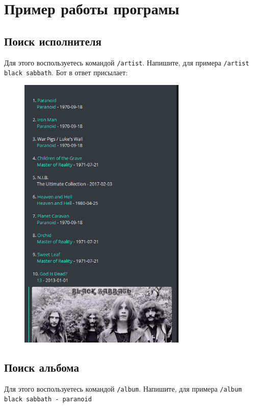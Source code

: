 \chapter{Пример работы програмы}

\section{Поиск исполнителя}

Для этого воспользуетесь командой \texttt{/artist}.  Напишите, для
примера \texttt{/artist black sabbath}.  Бот в ответ присылает:

\begin{figure}[H]
  \centering
  \includegraphics[width=8cm]{inc/img/artist.png}
\end{figure}

\section{Поиск альбома}

Для этого воспользуетесь командой \texttt{/album}.  Напишите, для
примера \texttt{/album black sabbath - paranoid}

